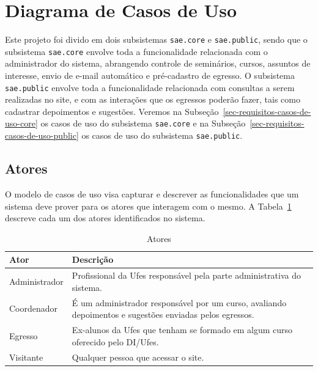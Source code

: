 \section{Diagrama de Casos de Uso}
\label{sec-requisitos-casos-de-uso}
	
Este projeto foi divido em dois subsistemas \texttt{sae.core} e \texttt{sae.public}, sendo que o subsistema \texttt{sae.core} envolve toda a funcionalidade relacionada com o administrador do sistema, abrangendo controle de seminários, cursos, assuntos de interesse, envio de e-mail automático e pré-cadastro de egresso. O subsistema \texttt{sae.public} envolve toda a funcionalidade relacionada com consultas a serem realizadas no site, e com as interações que os egressos poderão fazer, tais como cadastrar depoimentos e sugestões.
Veremos na Subseção~\ref{sec-requisitos-casos-de-uso-core} os casos de uso do subsistema \texttt{sae.core} e na Subseção~\ref{sec-requisitos-casos-de-uso-public} os casos de uso do subsistema \texttt{sae.public}.
	
	
	
\subsection{Atores}
\label{sec-requisitos-casos-de-uso-atores}
O modelo de casos de uso visa capturar e descrever as funcionalidades que um sistema deve prover para os atores que interagem com o mesmo. A Tabela~\ref{tabela-atores} descreve cada um dos atores identificados no sistema.


	
\begin{table}[h]
	\centering \vspace{0.5cm} \caption{ Atores}
	\begin{tabular}{|p{3cm}|p{12cm}|} \hline \rowcolor[rgb]{0.8,0.8,0.8}
 		Ator & Descrição \\\hline                              
		Administrador & Profissional da Ufes responsável pela parte administrativa do sistema. \\\hline   
		Coordenador & É um administrador responsável por um curso, avaliando depoimentos e sugestões enviadas pelos egressos. \\\hline                              
		Egresso & Ex-alunos da Ufes que tenham se formado em algum curso oferecido pelo DI/Ufes. \\\hline                              
		Visitante & Qualquer pessoa que acessar o site. \\\hline 		 
	\end{tabular}
	\label{tabela-atores}	
\end{table}

